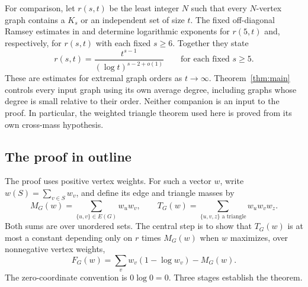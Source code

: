 \documentclass[11pt]{article}
\theoremstyle{definition}
\theoremstyle{remark}
\numberwithin{equation}{section}
\begin{document}
For comparison, let $r(s,t)$ be the least integer $N$ such that every
$N$-vertex graph contains a $K_s$ or an independent set of size $t$.
The fixed off-diagonal Ramsey estimates in
\cite[Theorem~1.1]{RamseyFive} and \cite[Theorem~1.1]{RamseyFixed}
determine logarithmic exponents for $r(5,t)$ and, respectively,
for $r(s,t)$ with each fixed $s\ge6$.
Together they state
\[
 r(s,t)=\frac{t^{s-1}}{(\log t)^{s-2+o(1)}}
 \qquad\text{for each fixed }s\ge5.
\]
These are estimates for extremal graph orders as $t\to\infty$.
Theorem~\ref{thm:main} controls every input graph using its own average
degree, including graphs whose degree is small relative to their order.
Neither companion is an input to the proof. In particular, the weighted
triangle theorem used here is proved from its own cross-mass hypothesis.


\subsection{The proof in outline}

The proof uses positive vertex weights. For such a vector $w$, write
$w(S)=\sum_{v\in S}w_v$, and define its edge and triangle masses by
\[
 M_G(w)=\sum_{\{u,v\}\in E(G)}w_uw_v,
 \qquad
 T_G(w)=\sum_{\{u,v,z\}\text{ a triangle}}w_uw_vw_z.
\]
Both sums are over unordered sets. The central step is to show that
$T_G(w)$ is at most a constant depending only on $r$ times $M_G(w)$
when $w$ maximizes, over nonnegative vertex weights,
\[
 F_G(w)=\sum_v w_v(1-\log w_v)-M_G(w).
\]
The zero-coordinate convention is $0\log0=0$.
Three stages establish the theorem.
\end{document}
